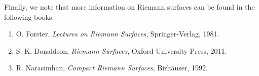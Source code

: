 \documentclass[10pt]{article}
\theoremstyle{newstyle}
\begin{document}
Finally, we note that more information on Riemann surfaces can be found in the following books. 
\begin{enumerate}
    \item O. Forster, {\it Lectures on Riemann Surfaces}, Springer-Verlag, 1981. 
    \item S. K. Donaldson, {\it Riemann Surfaces}, Oxford University Press, 2011. 
    \item R. Narasimhan, {\it Compact Riemann Surfaces}, Birh\"auser, 1992. 
\end{enumerate}
\end{document}
